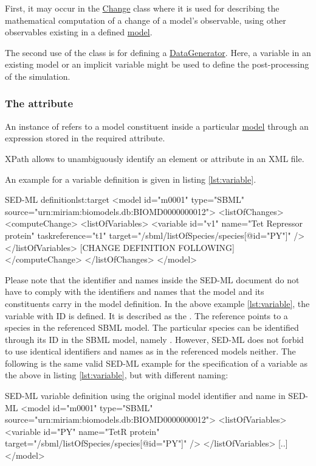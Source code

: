 First, it may occur in the \hyperref[class:change]{Change} class where it is used for describing the mathematical computation of a change of a model's observable, using other observables existing in a defined \hyperref[class:model]{model}.

The second use of the  class is for defining a \hyperref[class:dataGenerator]{DataGenerator}. Here, a variable in an existing model or an implicit variable might be used to define the post-processing of the simulation.

\subsubsection{The  attribute}
\label{sec:target}
An instance of  refers to a model constituent inside a particular \hyperref[class:model]{model} through an  expression stored in the required  attribute. 

XPath allows to unambiguously identify an element or attribute in an XML file.

An example for a variable definition is given in listing \ref{lst:variable}.
%
\begin{myXmlLst}{SED-ML  definition}{lst:target}
<model id="m0001" type="SBML" source="urn:miriam:biomodels.db:BIOMD0000000012">
 <listOfChanges>
  <computeChange>
   <listOfVariables>
    <variable id="v1" name="Tet Repressor protein" taskreference="t1"  target="/sbml/listOfSpecies/species[@id="PY"]" />
   </listOfVariables>
   [CHANGE DEFINITION FOLLOWING]
  </computeChange>
 </listOfChanges>
</model>
\end{myXmlLst}
%
Please note that the identifier and names inside the SED-ML document do not have to comply with the identifiers and names that the model and its constituents carry in the model definition. In the above example \ref{lst:variable}, the variable with ID  is defined. It is described as the . The reference points to a species in the referenced SBML model. The particular species can be identified through its ID in the SBML model, namely . However, SED-ML does not forbid to use identical identifiers and names as in the referenced models neither. The following is the same valid SED-ML example for the specification of a variable as the above in listing \ref{lst:variable}, but with different naming:
%
\begin{myXmlLst}{SED-ML variable definition using the original model identifier and name in SED-ML}{}
<model id="m0001" type="SBML" source="urn:miriam:biomodels.db:BIOMD0000000012">
 <listOfVariables>
  <variable id="PY" name="TetR protein" target="/sbml/listOfSpecies/species[@id="PY"]" />
 </listOfVariables>
 [..]
</model>
\end{myXmlLst}
%

